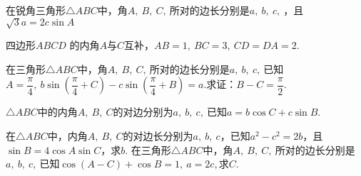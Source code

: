 \documentclass{BHCexam}
\begin{document}
\begin{questions}
\kongbai
\qs 在锐角三角形$\triangle ABC$中，角$A,~B,~C,~$所对的边长分别是$a,~b,~c,~$，且$ \sqrt{3}a=2c\sin A $
\newpage
\qs 四边形$ ABCD $ 的内角$ A $与$ C $互补，$ AB=1,~BC=3,~CD=DA=2. $

\kongbai
\qs 在三角形$\triangle ABC$中，角$A,~B,~C,~$所对的边长分别是$a,~b,~c,~$已知$ A=\dfrac{\pi}{4},~b\sin (\dfrac{\pi}{4}+C)-c\sin (\dfrac{\pi}{4}+B)=a. $求证：$ B-C=\dfrac{\pi}{2}. $

\newpage
\qs $\triangle ABC$中的内角$ A,~B,~C $的对边分别为$ a,~b,~c,~ $已知$ a=b\cos C+c\sin B $.
\kongbai
\qs 在$\triangle ABC$中，内角$ A,~B,~C $的对边长分别为$ a,~b,~c $，已知$ a^2-c^2=2b $，且$ \sin B=4\cos A\sin C $，求$ b $.
\newpage
\qs 在三角形$\triangle ABC$中，角$A,~B,~C,~$所对的边长分别是$a,~b,~c,~$已知$ \cos (A-C)+\cos B=1,~a=2c, $求$ C $.
\end{questions}
\end{document}
